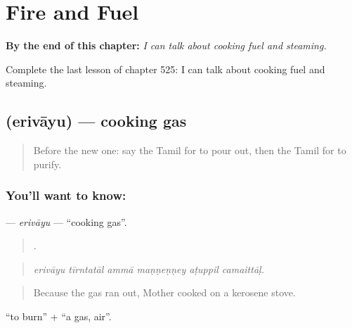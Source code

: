 
\chapter{Fire and Fuel}
\label{ch:ta-fire-and-fuel}

\begin{chapteropening}
\textbf{By the end of this chapter:} \emph{I can talk about cooking fuel and steaming.}

Complete the last lesson of chapter 525: I can talk about cooking fuel and steaming.
\end{chapteropening}

\section[\texorpdfstring{\ta{எரிவாயு} (erivāyu)}{எரிவாயு (erivāyu)}]{ (erivāyu) — cooking gas}

\label{lesson:TA-C525-erivayu}



\begin{quote}
Before the new one: say the Tamil for to pour out, then the Tamil for to purify.
\end{quote}

\subsection*{You'll want to know: }
\textbf{} — \emph{erivāyu} — \textquotedblleft{}cooking gas\textquotedblright{}.

\begin{quote}
     .
\end{quote}

\begin{quote}
\emph{erivāyu tīrntatāl ammā maṇṇeṇṇey aṭuppil camaittāḷ.}
\end{quote}

\begin{quote}
Because the gas ran out, Mother cooked on a kerosene stove.
\end{quote}

 \textquotedblleft{}to burn\textquotedblright{} +  \textquotedblleft{}a gas, air\textquotedblright{}.

